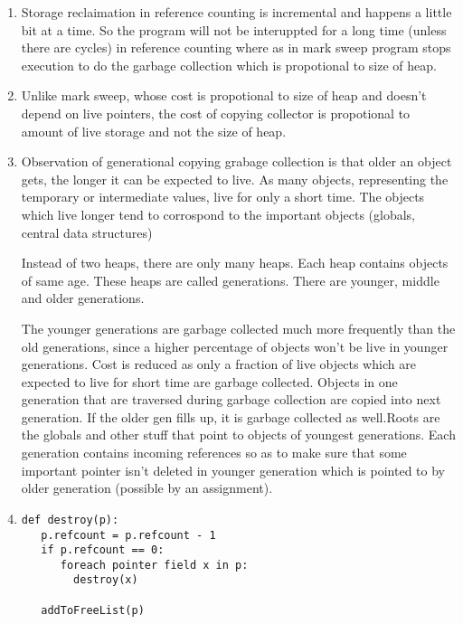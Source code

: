 \documentclass[12pt]{article}
\begin{document}
\begin{enumerate}[label=(\alph*)]
\item Storage reclaimation in reference counting is incremental and happens a little bit at a time. So the program will not be interuppted for a long time (unless there are cycles) in reference counting where as in mark sweep program stops execution to do the garbage collection which is propotional to size of heap.

\item Unlike mark sweep, whose cost is propotional to size of heap and doesn't depend on live pointers, the cost of copying collector is propotional to amount of live storage and not the size of heap.

\item Observation of generational copying grabage collection is that older an object gets, the longer it can be expected to live. As many objects, representing the temporary or intermediate values, live for only a short time. The objects which live longer tend to corrospond to the important objects (globals, central data structures)

Instead of two heaps, there are only many heaps. Each heap contains objects of same age. These heaps are called generations. There are younger, middle and older generations.

The younger generations are garbage collected much more frequently than the old generations, since a higher percentage of objects won't be live in younger generations. Cost is reduced as only a fraction of live objects which are expected to live for short time are garbage collected. Objects in one generation that are traversed during garbage collection are copied into next generation. If the older gen fills up, it is garbage collected as well.Roots are the globals and other stuff that point to objects of youngest generations. Each generation contains incoming references so as to make sure that some important pointer isn't deleted in younger generation which is pointed to by older generation (possible by an assignment).

\item 
\begin{verbatim}
def destroy(p):
   p.refcount = p.refcount - 1
   if p.refcount == 0:
   	  foreach pointer field x in p:
   	  	destroy(x)
   
   addToFreeList(p)
\end{verbatim}

\end{enumerate}
\end{document}
